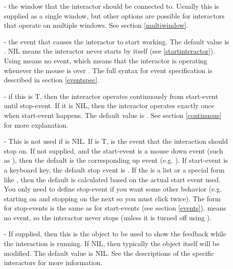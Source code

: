 \begin{description}
\item[] 
- the window that the interactor should be connected to.  Usually this is
supplied as a single window, but other options are possible for interactors
that operate on multiple windows.  See section \ref{multiwindow}.

\item[] 
- the event that causes the interactor to start
working.  The default value is .  NIL means the interactor
never starts by itself (see \ref{startinteractor}).
Using  means no event, which
means that the interactor is operating whenever the mouse is over
.  The full syntax for event
specification is described in section \ref{eventspec}.

\item[] 
- if this is T, then the interactor operates continuously
from start-event until stop-event.  If it is NIL, then the interactor
operates exactly once when start-event happens.  The default value
is .  See section \ref{continuous} for more explanation.

\item[] 
- This is not used if  is NIL.  If  is T,
 is the
event that the interaction should stop on.  If not supplied, and the
start-event is a mouse down event (such as ), then
the default  is the corresponding up event (e.g. ).
If start-event is a keyboard key, the default stop event is .  If
the 
is a list or a special form like , then the default
 is calculated based on the actual start event used.
You only need to define
stop-event if you want some other behavior (e.g. starting on 
and stopping on the next  so you must click twice).  The form
for stop-events is the same as for start-events (see
section \ref{events}).   means no event, so the
interactor never stops (unless it is turned off using ).

\item[] 
- If supplied, then this is the object to be used to show the feedback while the
interaction is running.  If NIL, then typically the object itself will be
modified.  The default value is NIL.  See the descriptions of the specific
interactors for more information.


\end{description}
